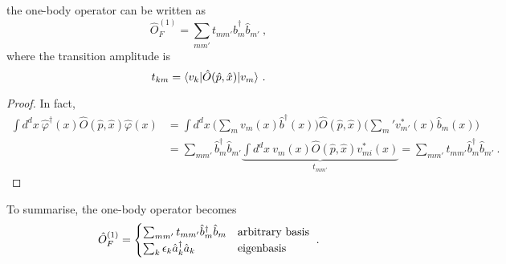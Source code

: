     the one-body operator can be written as
    \begin{equation}
        \hat O^{(1)}_F = \sum_{mm'} t_{mm'} \hat b_m^\dagger \hat b_{m'} ~,
    \end{equation}
    where the transition amplitude is
    \begin{equation}\label{genbas}
        t_{km} = \langle v_k\vert \hat O (\hat p, \hat x) \vert v_m\rangle ~.
    \end{equation}
    \begin{proof}
        In fact,
        \begin{equation*}
        \begin{aligned}
            \int d^d x ~ \hat \varphi^\dagger (x) \hat O (\hat p, \hat x) \hat \varphi (x) & = \int d^d x ~ \Big ( \sum_m v_m(x) \hat b^\dagger (x) \Big ) \hat O (\hat p, \hat x) \Big ( \sum_m' v_{m'}^* (x) \hat b_m (x) \Big ) \\ & = \sum_{mm'} \hat b_m^\dagger \hat b_{m'} \underbrace{\int d^d x ~ v_m (x) \hat O(\hat p, \hat x) v^*_{mi} (x)}_{t_{mm'}} = \sum_{mm'} t_{mm'} \hat b_m^\dagger \hat b_{m'} ~.
        \end{aligned}
        \end{equation*}
    \end{proof}

    To summarise, the one-body operator becomes
    \begin{equation*}
        \hat O^{(1)}_F = \begin{cases}
            \sum_{m m'} t_{mm'} \hat b^\dagger_m \hat b_m & \textnormal{arbitrary basis} \\
            \sum_k \epsilon_k \hat a^\dagger_k \hat a_k & \textnormal{eigenbasis} \\
        \end{cases} ~.
    \end{equation*}

